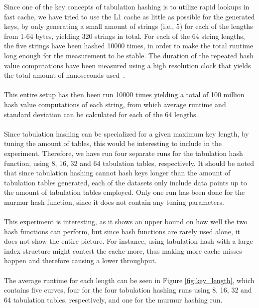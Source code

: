 \documentclass[11pt]{article} %
\begin{document}
Since one of the key concepts of tabulation hashing is to utilize rapid lookups in fast cache, we have tried to use the L1 cache as little as possible for the generated keys, by only generating a small amount of strings (i.e., 5) for each of the lengths from 1-64 bytes, yielding 320 strings in total. For each of the 64 string lengths, the five strings have been hashed 10000 times, in order to make the total runtime long enough for the measurement to be stable. The duration of the repeated hash value computations have been measured using a high resolution clock that yields the total amount of nanoseconds used~\cite{chrono}. \\
\\
This entire setup has then been run 10000 times yielding a total of 100 million hash value computations of each string, from which average runtime and standard deviation can be calculated for each of the 64 lengths. \\
\\
Since tabulation hashing can be specialized for a given maximum key length, by tuning the amount of tables, this would be interesting to include in the experiment. Therefore, we have run four separate runs for the tabulation hash function, using 8, 16, 32 and 64 tabulation tables, respectively. It should be noted that since tabulation hashing cannot hash keys longer than the amount of tabulation tables generated, each of the datasets only include data points up to the amount of tabulation tables employed. Only one run has been done for the murmur hash function, since it does not contain any tuning parameters. \\
\\
This experiment is interesting, as it shows an upper bound on how well the two hash functions can perform, but since hash functions are rarely used alone, it does not show the entire picture. For instance, using tabulation hash with a large index structure might contest the cache more, thus making more cache misses happen and therefore causing a lower throughput. \\
\\
The average runtime for each length can be seen in Figure \ref{fig:key_length}, which contains five curves, four for the four tabulation hashing runs using 8, 16, 32 and 64 tabulation tables, respectively, and one for the murmur hashing run. 
\end{document}
